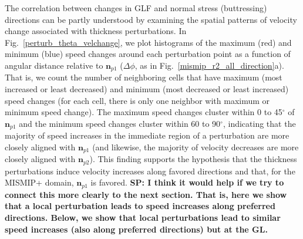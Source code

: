 \documentclass[review,oneside]{igs}
\begin{document}
The correlation between changes in GLF and normal stress (buttressing) directions can be partly understood by examining the spatial patterns of velocity change associated with thickness perturbations. %
In Fig.~\ref{perturb_theta_velchange}, we plot histograms of the maximum (red) and minimum (blue) speed changes around each perturbation point as a function of angular distance relative to $\mathbf{n}_{p1}$ ($\Delta\phi$, as in Fig.~\ref{mismip_r2_all_direction}a). That is, we count the number of neighboring cells that have maximum (most increased or least decreased) and minimum (most decreased or least increased) speed changes (for each cell, there is only one neighbor with maximum or minimum speed change).  %
The maximum speed changes cluster within 0 to 45$^\circ$ of $\mathbf{n}_{p1}$ and the minimum speed changes cluster within 60 to 90$^\circ$, indicating that the majority of speed increases in the immediate region of a perturbation are more closely aligned with $\mathbf{n}_{p1}$ (and likewise, the majority of velocity decreases are more closely aligned with $\mathbf{n}_{p2}$). This finding supports the hypothesis that the thickness perturbations induce velocity increases along favored directions and that, for the MISMIP+ domain, $\mathbf{n}_{p1}$ is favored. 
\textbf{SP: I think it would help if we try to connect this more clearly to the next section. That is, here we show that a local perturbation leads to speed increases along preferred directions. Below, we show that local perturbations lead to similar speed increases (also along preferred directions) but at the GL.}

\end{document}
